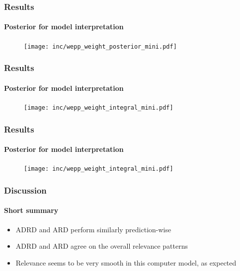 \documentclass{snedecorbeamer}
\begin{document}
\begin{frame}
  \frametitle{Results}
  \framesubtitle{Posterior for model interpretation}

  \begin{figure}
    \centering
    \texttt{[image: inc/wepp\_weight\_posterior\_mini.pdf]}
  \end{figure}

\end{frame}

\begin{frame}
  \frametitle{Results}
  \framesubtitle{Posterior for model interpretation}

  \begin{figure}
    \centering
    \texttt{[image: inc/wepp\_weight\_integral\_mini.pdf]}
  \end{figure}

\end{frame}

\begin{frame}
  \frametitle{Results}
  \framesubtitle{Posterior for model interpretation}

  \begin{figure}
    \centering
    \texttt{[image: inc/wepp\_weight\_integral\_mini.pdf]}
  \end{figure}

\end{frame}

\begin{frame}
  \frametitle{Discussion}
  \framesubtitle{Short summary}

  \begin{itemize}
  \item \textsc{ADRD} and \textsc{ARD} perform similarly prediction-wise
  \item \textsc{ADRD} and \textsc{ARD} agree on the overall relevance patterns
  \item Relevance seems to be very smooth in this computer model, as expected
  \end{itemize}
\end{frame}
\end{document}
